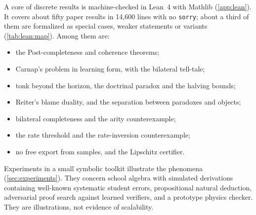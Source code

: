 A core of discrete results is machine-checked in Lean~4 \citep{demoura2021lean4} with Mathlib \citep{mathlib2020} (\cref{app:lean}). It covers about fifty paper results in 14{,}600 lines with no \texttt{sorry}; about a third of them are formalized as special cases, weaker statements or variants (\cref{tab:lean:map}). Among them are:
\begin{itemize}
\item the Post-completeness and coherence theorems;
\item Carnap's problem in learning form, with the bilateral tell-tale;
\item tonk beyond the horizon, the doctrinal paradox and the halving bounds;
\item Reiter's blame duality, and the separation between paradoxes and objects;
\item bilateral completeness and the arity counterexample;
\item the rate threshold and the rate-inversion counterexample;
\item no free export from samples, and the Lipschitz certifier.
\end{itemize}
Experiments in a small symbolic toolkit illustrate the phenomena (\cref{sec:experiments}). They concern school algebra with simulated derivations containing well-known systematic student errors, propositional natural deduction, adversarial proof search against learned verifiers, and a prototype physics checker. They are illustrations, not evidence of scalability.


